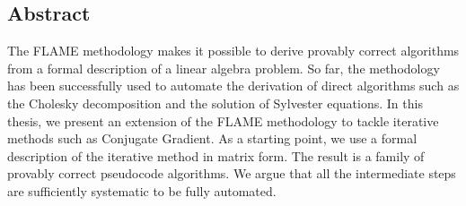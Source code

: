 \cleardoublepage

\subsection*{Abstract}

The FLAME methodology makes it possible to derive provably correct algorithms from a formal description of a linear algebra problem. So far, the methodology has been successfully used to automate the derivation of direct algorithms such as the Cholesky decomposition and the solution of Sylvester equations. In this thesis, we present an extension of the FLAME methodology to tackle iterative methods such as Conjugate Gradient. As a starting point, we use a formal description of the iterative method in matrix form. The result is a family of provably correct pseudocode algorithms. We argue that all the intermediate steps are sufficiently systematic to be fully automated.